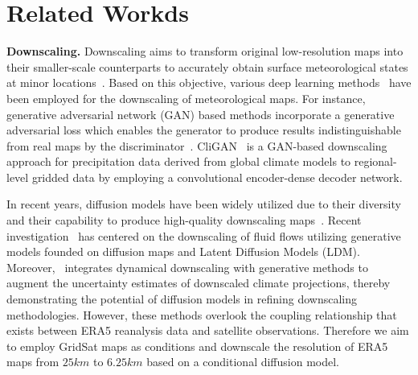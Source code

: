 \section{Related Workds}
\label{sec:related}

\textbf{Downscaling.}
Downscaling aims to transform original low-resolution maps into their smaller-scale counterparts to accurately obtain surface meteorological states at minor locations~\cite{chajaei2024machine, doll2024streamflow, wang2024spatial}. 
Based on this objective, various deep learning methods~\cite{menon2020pulse,maraun2016bias} have been employed for the downscaling of meteorological maps. 
For instance, generative adversarial network (GAN) based methods incorporate a generative adversarial loss which enables the generator to produce results indistinguishable from real maps by the discriminator~\cite{chen2020adversarial}. 
CliGAN~\cite{chaudhuri2020cligan} is a GAN-based downscaling approach for precipitation data derived from global climate models to regional-level gridded data by employing a convolutional encoder-dense decoder network.

In recent years, diffusion models have been widely utilized due to their diversity and their capability to produce high-quality downscaling maps~\cite{fei2023generative}. 
Recent investigation~\cite{bischoff2024unpaired} has centered on the downscaling of fluid flows utilizing generative models founded on diffusion maps and Latent Diffusion Models (LDM). 
Moreover,~\cite{lopez2024dynamical} integrates dynamical downscaling with generative methods to augment the uncertainty estimates of downscaled climate projections, thereby demonstrating the potential of diffusion models in refining downscaling methodologies.
However, these methods overlook the coupling relationship that exists between ERA5 reanalysis data and satellite observations.
Therefore we aim to employ GridSat maps as conditions and downscale the resolution of ERA5 maps from $25km$ to $6.25km$ based on a conditional diffusion model. 


